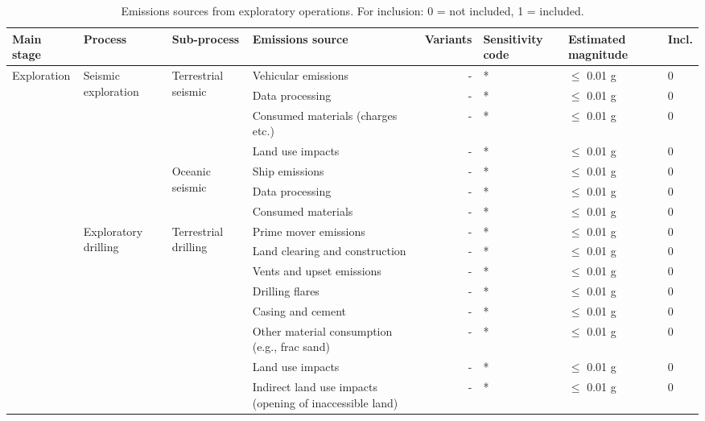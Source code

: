 \documentclass[11pt]{report}
\begin{document}
{{{{\begin{landscape}
\begin{table}
\begin{scriptsize}
\caption{Emissions sources from exploratory operations. For inclusion: 0 = not included, 1 = included.}
\label{tab:exploration_sources}
\begin{tabular}{|p{}|p{}|p{}|p{}|r|p{}|p{}|p{}|}
\hline
\textbf{Main stage} & \textbf{Process} & \textbf{Sub-process} & \textbf{Emissions source} & \textbf{Variants}& \textbf{Sensitivity code} & \textbf{Estimated magnitude} & \textbf{Incl.}\\
\hline
\multirow{25}{0.08\columnwidth}{Exploration} & \multirow{7}{0.09\columnwidth}{Seismic exploration} & \multirow{4}{0.09\columnwidth}{Terrestrial seismic} & Vehicular emissions & - & * & $\leq$ 0.01 g & 0\\
\cline{4-8}
& & & Data processing & - & * & $\leq$ 0.01 g & 0\\
\cline{4-8}
& & & Consumed materials (charges etc.) & - & * & $\leq$ 0.01 g & 0\\
\cline{4-8}
& & & Land use impacts & - & * & $\leq$ 0.01 g & 0\\
\cline{3-8}
& & \multirow{3}{*}{Oceanic seismic} & Ship emissions & - & * & $\leq$ 0.01 g & 0\\
\cline{4-8}
& & & Data processing & - & * & $\leq$ 0.01 g & 0\\
\cline{4-8}
& & & Consumed materials & - & * & $\leq$ 0.01 g & 0\\
\cline{2-8}
& \multirow{12}{0.09\columnwidth}{Exploratory drilling} & \multirow{8}{0.09\columnwidth}{Terrestrial drilling} & Prime mover emissions & - & * & $\leq$ 0.01 g & 0\\
\cline{4-8}
& & & Land clearing and construction & - & * & $\leq$ 0.01 g & 0\\
\cline{4-8}
& & & Vents and upset emissions & - & * & $\leq$ 0.01 g & 0\\
\cline{4-8}
& & & Drilling flares & - & * & $\leq$ 0.01 g & 0\\
\cline{4-8}
& & & Casing and cement & - & * & $\leq$ 0.01 g & 0\\
\cline{4-8}
& & & Other material consumption (e.g., frac sand) & - & * & $\leq$ 0.01 g & 0\\
\cline{4-8}
& & & Land use impacts & - & * & $\leq$ 0.01 g & 0\\
\cline{4-8}
& & & Indirect land use impacts (opening of inaccessible land) & - & * & $\leq$ 0.01 g & 0\\

\end{tabular}
\end{scriptsize}
\end{table}
\end{landscape}}}}}
\end{document}
